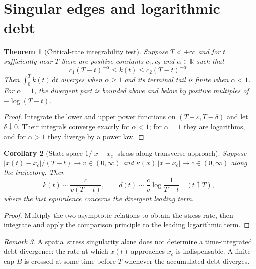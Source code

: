 \documentclass[11pt,letterpaper]{article}
\newtheorem{theorem}{Theorem}[section]
\newtheorem{corollary}[theorem]{Corollary}
\theoremstyle{definition}\newtheorem{definition}[theorem]{Definition}\newtheorem{example}[theorem]{Example}
\theoremstyle{remark}\newtheorem{remark}[theorem]{Remark}
\newcommand{\R}{\mathbb R}\newcommand{\dd}{\mathrm d}\newcommand{\ess}{\operatorname{ess}}
\begin{document}
\section{Singular edges and logarithmic debt}
\begin{theorem}[Critical-rate integrability test]\label{th:singular}
Suppose $T<+\infty$ and for $t$ sufficiently near $T$ there are positive constants $c_1,c_2$ and $\alpha\in\R$ such that
\begin{equation}\label{eq:power}
 c_1(T-t)^{-\alpha}\leq k(t)\leq c_2(T-t)^{-\alpha}.
\end{equation}
Then $\int_0^T k(t)\,\dd t$ diverges when $\alpha\geq1$ and its \emph{terminal tail} is finite when $\alpha<1$. For $\alpha=1$, the divergent part is bounded above and below by positive multiples of $-\log(T-t)$.
\end{theorem}
\begin{proof}
Integrate the lower and upper power functions on $(T-\varepsilon,T-\delta)$ and let $\delta\downarrow0$. Their integrals converge exactly for $\alpha<1$; for $\alpha=1$ they are logarithms, and for $\alpha>1$ they diverge by a power law.
\end{proof}
\begin{corollary}[State-space $1/|x-x_c|$ stress along transverse approach]\label{cor:edge}
Suppose $|x(t)-x_c|/(T-t)\to v\in(0,\infty)$ and $\kappa(x)\,|x-x_c|\to c\in(0,\infty)$ along the trajectory. Then
\begin{equation}\label{eq:log}
 k(t)\sim\frac{c}{v(T-t)},\qquad
 d(t)\sim\frac{c}{v}\log\frac1{T-t}\quad(t\uparrow T),
\end{equation}
where the last equivalence concerns the divergent leading term.
\end{corollary}
\begin{proof}
Multiply the two asymptotic relations to obtain the stress rate, then integrate and apply the comparison principle to the leading logarithmic term.
\end{proof}
\begin{remark}
A spatial stress singularity alone does not determine a time-integrated debt divergence: the rate at which $x(t)$ approaches $x_c$ is indispensable. A finite cap $B$ is crossed at some time before $T$ whenever the accumulated debt diverges.
\end{remark}
\end{document}
